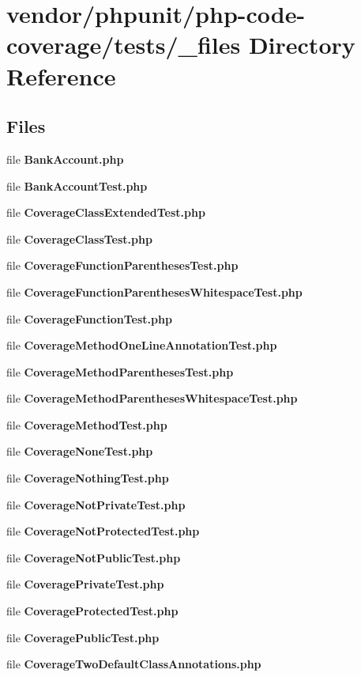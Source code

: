 \section{vendor/phpunit/php-\/code-\/coverage/tests/\+\_\+files Directory Reference}
\label{dir_dbb0edfe1b14b6026aba67a5228b4e77}
\subsection*{Files}
\begin{DoxyCompactItemize}
\item 
file {\bf Bank\+Account.\+php}
\item 
file {\bf Bank\+Account\+Test.\+php}
\item 
file {\bf Coverage\+Class\+Extended\+Test.\+php}
\item 
file {\bf Coverage\+Class\+Test.\+php}
\item 
file {\bf Coverage\+Function\+Parentheses\+Test.\+php}
\item 
file {\bf Coverage\+Function\+Parentheses\+Whitespace\+Test.\+php}
\item 
file {\bf Coverage\+Function\+Test.\+php}
\item 
file {\bf Coverage\+Method\+One\+Line\+Annotation\+Test.\+php}
\item 
file {\bf Coverage\+Method\+Parentheses\+Test.\+php}
\item 
file {\bf Coverage\+Method\+Parentheses\+Whitespace\+Test.\+php}
\item 
file {\bf Coverage\+Method\+Test.\+php}
\item 
file {\bf Coverage\+None\+Test.\+php}
\item 
file {\bf Coverage\+Nothing\+Test.\+php}
\item 
file {\bf Coverage\+Not\+Private\+Test.\+php}
\item 
file {\bf Coverage\+Not\+Protected\+Test.\+php}
\item 
file {\bf Coverage\+Not\+Public\+Test.\+php}
\item 
file {\bf Coverage\+Private\+Test.\+php}
\item 
file {\bf Coverage\+Protected\+Test.\+php}
\item 
file {\bf Coverage\+Public\+Test.\+php}
\item 
file {\bf Coverage\+Two\+Default\+Class\+Annotations.\+php}
\item 

\end{DoxyCompactItemize}
